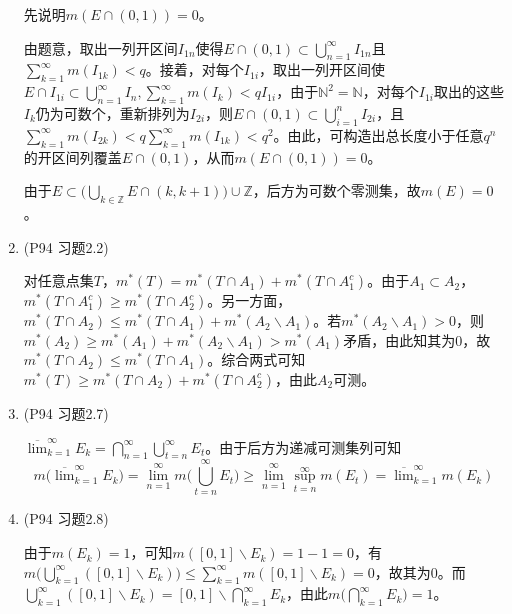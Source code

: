 \documentclass[a4paper,UTF8,fontset=windows]{ctexart}
\begin{document}
\begin{enumerate}
    先说明$m(E\cap(0,1))=0$。
    
    由题意，取出一列开区间$I_{1n}$使得$E\cap(0,1)\subset\bigcup_{n=1}^\infty I_{1n}$且$\sum_{k=1}^\infty m(I_{1k})<q$。接着，对每个$I_{1i}$，取出一列开区间使$E\cap I_{1i}\subset\bigcup_{n=1}^\infty I_n,\sum_{k=1}^\infty m(I_k)<qI_{1i}$，由于$\mathbb{N}^2=\mathbb{N}$，对每个$I_{1i}$取出的这些$I_k$仍为可数个，重新排列为$I_{2i}$，则$E\cap(0,1)\subset\bigcup_{i=1}^nI_{2i}$，且$\sum_{k=1}^\infty m(I_{2k})<q\sum_{k=1}^\infty m(I_{1k})<q^2$。由此，可构造出总长度小于任意$q^n$的开区间列覆盖$E\cap(0,1)$，从而$m(E\cap(0,1))=0$。
    
    由于$E\subset\big(\bigcup_{k\in\mathbb{Z}}E\cap(k,k+1)\big)\cup\mathbb{Z}$，后方为可数个零测集，故$m(E)=0$。
    
    \item (P94 习题2.2)
    
    对任意点集$T$，$m^*(T)=m^*(T\cap A_1)+m^*(T\cap A_1^c)$。由于$A_1\subset A_2$，$m^*(T\cap A_1^c)\ge m^*(T\cap A_2^c)$。另一方面，$m^*(T\cap A_2)\le m^*(T\cap A_1)+m^*(A_2\backslash A_1)$。若$m^*(A_2\backslash A_1)>0$，则$m^*(A_2)\ge m^*(A_1)+m^*(A_2\backslash A_1)>m^*(A_1)$矛盾，由此知其为0，故$m^*(T\cap A_2)\le m^*(T\cap A_1)$。综合两式可知$m^*(T)\ge m^*(T\cap A_2)+m^*(T\cap A_2^c)$，由此$A_2$可测。
    
    \item (P94 习题2.7)
    
    $\overline{\lim}_{k=1}^\infty E_k=\bigcap_{n=1}^\infty\bigcup_{t=n}^\infty E_t$。由于后方为递减可测集列可知
    \[m\big(\overline{\lim}_{k=1}^\infty E_k\big)=\lim_{n=1}^\infty m\bigg(\bigcup_{t=n}^\infty E_t\bigg)\ge\lim_{n=1}^\infty\sup_{t=n}^\infty m(E_t)=\overline{\lim}_{k=1}^\infty m(E_k)\]
    
    \item (P94 习题2.8)
    
    由于$m(E_k)=1$，可知$m([0,1]\backslash E_k)=1-1=0$，有$m\big(\bigcup_{k=1}^\infty([0,1]\backslash E_k)\big)\le\sum_{k=1}^\infty m([0,1]\backslash E_k)=0$，故其为0。而$\bigcup_{k=1}^\infty([0,1]\backslash E_k)=[0,1]\backslash\bigcap_{k=1}^\infty E_k$，由此$m\big(\bigcap_{k=1}^\infty E_k\big)=1$。
\end{enumerate}
\end{document}
